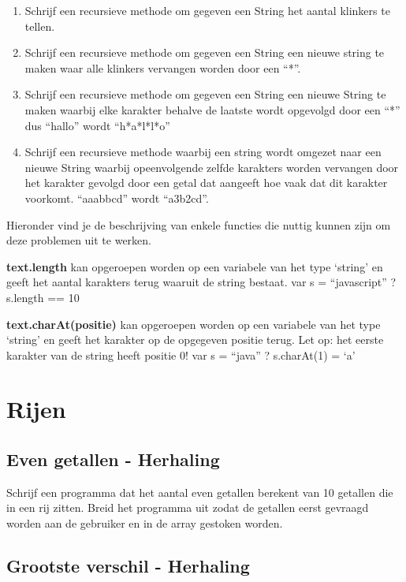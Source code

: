 \begin{enumerate}
\item Schrijf een recursieve methode om gegeven een String het aantal klinkers te tellen.
\item Schrijf een recursieve methode om gegeven een String een nieuwe string te maken waar alle klinkers vervangen worden door een ``*''.
\item  Schrijf een recursieve methode om gegeven een String een nieuwe String te maken waarbij elke karakter behalve de laatste wordt opgevolgd door een ``*'' dus ``hallo'' wordt ``h*a*l*l*o''
\item Schrijf een recursieve methode waarbij een string wordt omgezet naar een nieuwe String waarbij opeenvolgende zelfde karakters worden vervangen door  het karakter gevolgd door een getal dat aangeeft hoe vaak dat dit karakter voorkomt. ``aaabbcd'' wordt ``a3b2cd''.
\end{enumerate}

Hieronder vind je de beschrijving van enkele functies die nuttig kunnen zijn om deze problemen uit te werken.

\textbf{text.length} kan opgeroepen worden op een variabele van het type `string' en geeft het aantal karakters terug waaruit de string bestaat. var s = ``javascript'' ? s.length == 10

\textbf{text.charAt(positie)} kan opgeroepen worden op een variabele van het type `string' en geeft het karakter op de opgegeven positie terug. Let op: het eerste karakter van de string heeft positie 0! var s = ``java'' ? s.charAt(1) = `a'


\section{Rijen}

\subsection{Even getallen - Herhaling}

Schrijf een programma dat het aantal even getallen berekent van 10 getallen die in een rij zitten. Breid het programma uit zodat de getallen eerst gevraagd worden aan de gebruiker en in de array gestoken worden.

\subsection{Grootste verschil - Herhaling}

